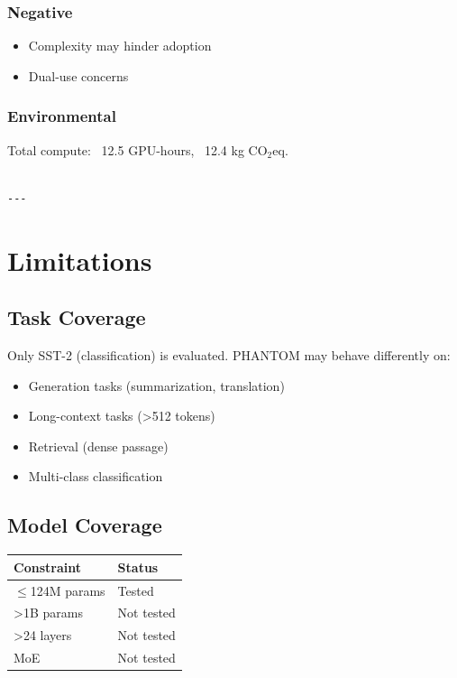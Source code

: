\subsubsection{Negative}
\begin{itemize}
\item Complexity may hinder adoption
\item Dual-use concerns

\end{itemize}
\subsubsection{Environmental}
Total compute: ~12.5 GPU-hours, ~12.4 kg CO$_2$eq.
\begin{lstlisting}

---
\end{lstlisting}


\section{Limitations}

\subsection{Task Coverage}

Only SST-2 (classification) is evaluated. PHANTOM may behave differently on:
\begin{itemize}
\item Generation tasks (summarization, translation)
\item Long-context tasks (\textgreater{}512 tokens)
\item Retrieval (dense passage)
\item Multi-class classification

\end{itemize}
\subsection{Model Coverage}

\begin{table}[H]
\centering
\small
\begin{tabular}{ll}
\toprule
\textbf{Constraint} & \textbf{Status} \\
\midrule
$\le$124M params & Tested \\
\textgreater{}1B params & Not tested \\
\textgreater{}24 layers & Not tested \\
MoE & Not tested \\
\bottomrule
\end{tabular}
\end{table}

